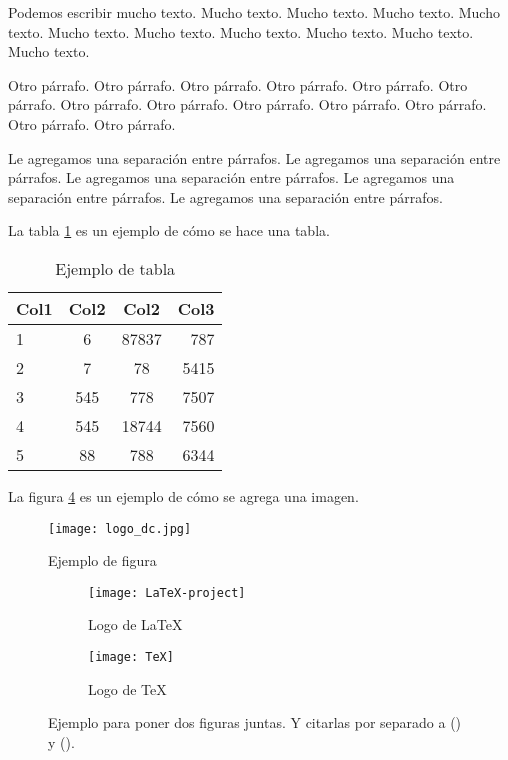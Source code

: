 \documentclass[10pt,a4paper]{article}
\begin{document}
Podemos escribir mucho texto. Mucho texto. Mucho texto. Mucho texto. Mucho texto. Mucho texto. Mucho texto. Mucho texto. Mucho texto. Mucho texto. Mucho texto.

Otro párrafo. Otro párrafo. Otro párrafo. Otro párrafo. Otro párrafo. Otro párrafo. Otro párrafo. Otro párrafo. Otro párrafo. Otro párrafo. Otro párrafo. Otro párrafo. Otro párrafo.

\vspace{0.3cm}

Le agregamos una separación entre párrafos. Le agregamos una separación entre párrafos. Le agregamos una separación entre párrafos. Le agregamos una separación entre párrafos. Le agregamos una separación entre párrafos.

\vspace{0.3cm}

La tabla \ref{tab:ejemplo} es un ejemplo de cómo se hace una tabla.

\begin{table}[h!]
	\centering
	\begin{tabular}{||l c c r||} 
		\hline
		Col1 & Col2 & Col2 & Col3 \\ [0.5ex] 
		\hline\hline
		1 & 6 & 87837 & 787 \\ 
		2 & 7 & 78 & 5415 \\
		3 & 545 & 778 & 7507 \\
		4 & 545 & 18744 & 7560 \\
		5 & 88 & 788 & 6344 \\
		\hline
	\end{tabular}
	\caption{Ejemplo de tabla}
	\label{tab:ejemplo}
\end{table}


La figura \ref{fig:subfigs} es un ejemplo de cómo se agrega una imagen.

\begin{figure}[ht]
	\centering
	\texttt{[image: logo\_dc.jpg]}
	\caption{Ejemplo de figura}
	\label{fig:ejemplo}
\end{figure}

\begin{figure}[ht!]
	\begin{subfigure}{0.5\textwidth}
		\texttt{[image: LaTeX-project]} 
		\caption{Logo de LaTeX}
		\label{fig:subfig1}
	\end{subfigure}
	\begin{subfigure}{0.5\textwidth}
		\texttt{[image: TeX]}
		\caption{Logo de TeX}
		\label{fig:subfig2}
	\end{subfigure}
	\caption{Ejemplo para poner dos figuras juntas. Y citarlas por separado a () y ().}
	\label{fig:subfigs}
\end{figure}
\end{document}
